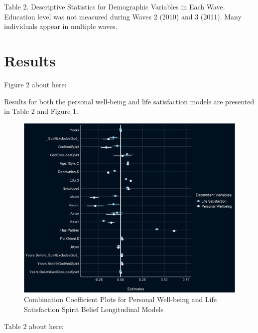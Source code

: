 \documentclass[
  english,
  man]{apa6}
\begin{document}
Table 2. Descriptive Statistics for Demographic Variables in Each Wave. Education level was not measured during Waves 2 (2010) and 3 (2011). Many individuals appear in multiple waves.

\hypertarget{results}{%
\section{Results}\label{results}}

Figure 2 about here:

Results for both the personal well-being and life satisfaction models are presented in Table 2 and Figure 1.

\begin{figure}

{\centering \includegraphics[width=6.4in]{figs/USEcoefficientplots-1} 

}

\caption{Combination Coefficient Plots for Personal Well-being and Life Satisfaction Spirit Belief Longitudinal Models}\label{fig:unnamed-chunk-5}
\end{figure}

Table 2 about here:
\end{document}
